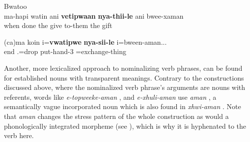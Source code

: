  
\ea\label{ex:Bwatoo_derivVP}
Bwatoo \parencite[32]{rivierre_bwatoo_2006}\\
\gll ma-hapi watin ani \textbf{vetipwaan} \textbf{nya-thii-le} ani bwee-xaman\\
 when done the give to-them the gift\\
\z


\ea\label{ex:Vam_derivVP}
\gll (ca)ma koin i=\textbf{vwatipwe} \textbf{nya-sii-le} i=bween-aman...\\
  end .=drop put-hand-3 =exchange-thing\\
\glt {}
\z

\begin{sloppypar}
Another, more lexicalized approach to nominalizing verb phrases, can be found for established nouns with transparent meanings. Contrary to the constructions discussed above, where the nominalized verb phrase's arguments are nouns with referents, words like \textit{e-topweeke-aman} , and \textit{e-xhuli-aman}  use \textit{aman} , a semantically vague incorporated noun which is also found in \textit{xhwi-aman} . Note that \textit{aman} changes the stress pattern of the whole construction as would a phonologically integrated morpheme (see ), which is why it is hyphenated to the verb here.
\end{sloppypar}

